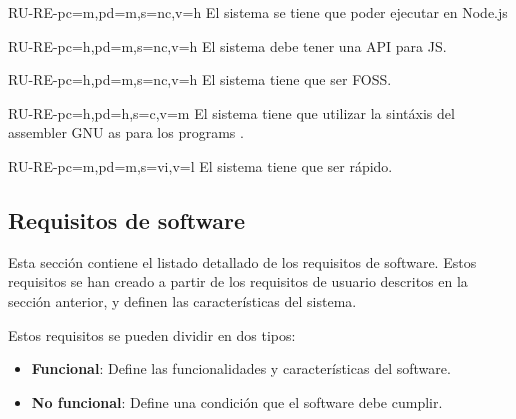 \begin{userReq}{RU-RE-}{pc=m,pd=m,s=nc,v=h}
    El sistema se tiene que poder ejecutar en Node.js
\end{userReq}

\begin{userReq}{RU-RE-}{pc=h,pd=m,s=nc,v=h}
    El sistema debe tener una \gls{API} para \gls{JS}.
\end{userReq}

\begin{userReq}{RU-RE-}{pc=h,pd=m,s=nc,v=h}
    El sistema tiene que ser \gls{FOSS}.
\end{userReq}

\begin{userReq}{RU-RE-}{pc=h,pd=h,s=c,v=m}
    El sistema tiene que utilizar la sintáxis del \gls{assembler} GNU as para
    los \glspl{program} .
\end{userReq}

\begin{userReq}{RU-RE-}{pc=m,pd=m,s=vi,v=l}
    El sistema tiene que ser rápido. %
\end{userReq}

\FloatBarrier


\subsection{Requisitos de software}\label{subsec:software-requirements}

Esta sección contiene el listado detallado de los requisitos de software. Estos
requisitos se han creado a partir de los requisitos de usuario descritos en la
sección anterior, y definen las características del sistema.

\noindent
Estos requisitos se pueden dividir en dos tipos:

\begin{itemize}
    \item \textbf{Funcional}: Define las funcionalidades y características del
    software.
    \item \textbf{No funcional}: Define una condición que el software debe cumplir.
\end{itemize}

